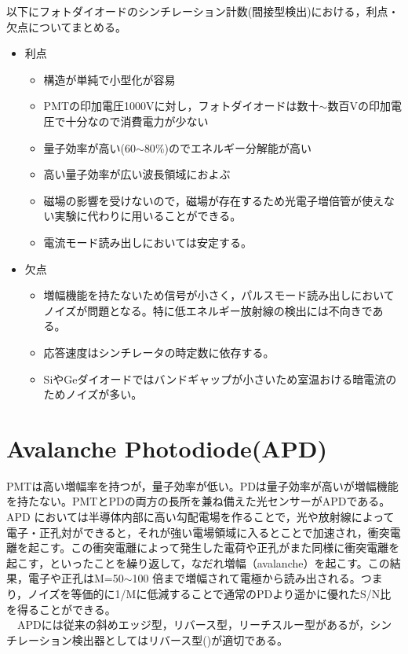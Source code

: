 以下にフォトダイオードのシンチレーション計数(間接型検出)における，利点・欠点についてまとめる。
\begin{itemize}
\item 利点

\begin{itemize}
\item 構造が単純で小型化が容易
\item PMTの印加電圧1000Vに対し，フォトダイオードは数十$\sim$数百Vの印加電圧で十分なので消費電力が少ない
\item 量子効率が高い(60$\sim$80$\%$)のでエネルギー分解能が高い
\item 高い量子効率が広い波長領域におよぶ
\item 磁場の影響を受けないので，磁場が存在するため光電子増倍管が使えない実験に代わりに用いることができる。
\item 電流モード読み出しにおいては安定する。
\end{itemize}

\item 欠点
\begin{itemize}
\item 増幅機能を持たないため信号が小さく，パルスモード読み出しにおいてノイズが問題となる。特に低エネルギー放射線の検出には不向きである。
\item 応答速度はシンチレータの時定数に依存する。
\item SiやGeダイオードではバンドギャップが小さいため室温おける暗電流のためノイズが多い。
\end{itemize}

\end{itemize}




\section{Avalanche Photodiode(APD)\label{sec:APD}}
PMTは高い増幅率を持つが，量子効率が低い。PDは量子効率が高いが増幅機能を持たない。PMTとPDの両方の長所を兼ね備えた光センサーがAPDである。APD においては半導体内部に高い勾配電場を作ることで，光や放射線によって電子・正孔対ができると，それが強い電場領域に入るとことで加速され，衝突電離を起こす。この衝突電離によって発生した電荷や正孔がまた同様に衝突電離を起こす，といったことを繰り返して，なだれ増幅（avalanche）を起こす。この結果，電子や正孔はM=50$\sim$100 倍まで増幅されて電極から読み出される。つまり，ノイズを等価的に1/Mに低減することで通常のPDより遥かに優れたS/N比を得ることができる。\\
\ \ APDには従来の斜めエッジ型，リバース型，リーチスルー型があるが，シンチレーション検出器としてはリバース型()が適切である。

